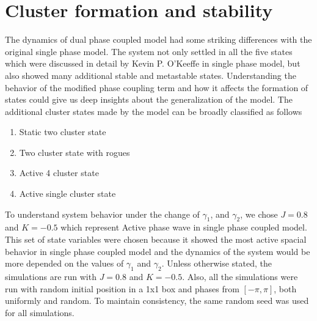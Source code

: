 \documentclass[twocolumn,10pt]{asme2ej}
\newcommand{\squeezeup}{\vspace{-3mm}}
\begin{document}



\section{Cluster formation and stability}
{
    The dynamics of dual phase coupled model had some striking differences with the original single phase model. The system not only settled in all the five states which were discussed in detail by Kevin P. O'Keeffe in single phase model, but also showed many additional stable and metastable states. Understanding the behavior of the modified phase coupling term and how it affects the formation of states could give us deep insights about the generalization of the model.
    The additional cluster states made by the model can be broadly classified as follows 
    \begin{enumerate}[label = (\alph*)]
        \item Static two cluster state
        \item Two cluster state with rogues 
        \item Active 4 cluster state
        \item Active single cluster state
    \end{enumerate}
    \noindent
    To understand system behavior under the change of \(\gamma_1\), and \(\gamma_2\), we chose \(J = 0.8\) and \(K = -0.5\) which represent Active phase wave in single phase coupled model. This set of state variables were chosen because it showed the most active spacial behavior in single phase coupled model and the dynamics of the system would be more depended on the values of \(\gamma_1\) and \(\gamma_2\). Unless otherwise stated, the simulations are run with \(J = 0.8\) and \(K = -0.5\). Also, all the simulations were run with random initial position in a 1x1 box and phases from \([-\pi, \pi]\), both uniformly and random. To maintain consistency, the same random seed was used for all simulations.
    \squeezeup
    \begin{figure}[h!]

\end{figure}}
\end{document}
